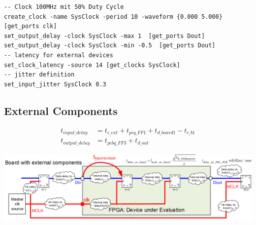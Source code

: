 \begin{lstlisting}
-- Clock 100MHz mit 50% Duty Cycle
create_clock -name SysClock -period 10 -waveform {0.000 5.000} [get_ports clk]
set_output_delay -clock SysClock -max 1  [get_ports Dout]
set_output_delay -clock SysClock -min -0.5  [get_ports Dout]
-- latency for external devices
set_clock_latency -source 14 [get_clocks SysClock]
-- jitter definition
set_input_jitter SysClock 0.3
\end{lstlisting}

\subsection{External Components}
\begin{align*}
	t_{input\_delay} &= t_{c\_ext} + t_{pcq\_FF1} + t_{d\_board1} - t_{c\_b1} \\
	t_{output\_delay} &= t_{pcbq\_FF3} + t_{d\_out}
\end{align*}
	
\begin{center}
	\includegraphics[width=\columnwidth]{Images/clock1}
\end{center}
